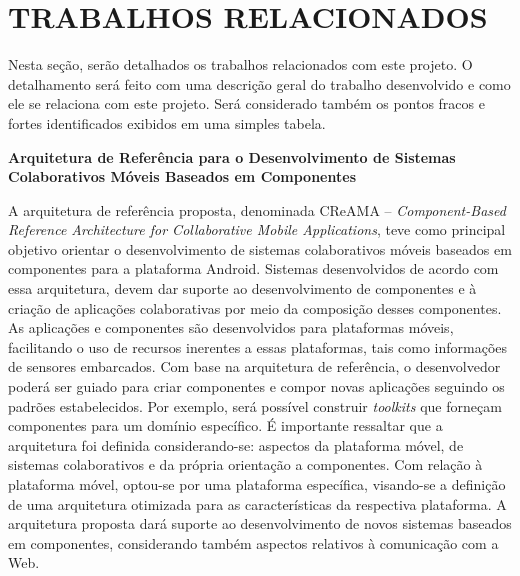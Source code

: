
\section{TRABALHOS RELACIONADOS}
Nesta seção, serão detalhados os trabalhos relacionados com este projeto. O detalhamento será feito com uma descrição geral do trabalho desenvolvido e como ele se relaciona com este projeto. Será considerado também os pontos fracos e fortes identificados exibidos em uma simples tabela.

\textbf{Arquitetura de Referência para o Desenvolvimento de Sistemas Colaborativos Móveis Baseados em Componentes}\par
A arquitetura de referência proposta, denominada CReAMA – \textit{Component-Based Reference Architecture for Collaborative Mobile Applications}, teve como principal objetivo orientar o desenvolvimento de sistemas colaborativos móveis baseados em componentes para a plataforma Android. Sistemas desenvolvidos de acordo com essa arquitetura, devem dar suporte ao desenvolvimento de componentes e à criação de aplicações colaborativas por meio da composição desses componentes. As aplicações e componentes são desenvolvidos para plataformas móveis, facilitando o uso de recursos inerentes a essas plataformas, tais como informações de sensores embarcados. Com base na arquitetura de referência, o desenvolvedor poderá ser guiado para criar componentes e compor novas aplicações seguindo os padrões estabelecidos. Por exemplo, será possível construir \textit{toolkits} que forneçam componentes para um domínio específico. É importante ressaltar que a arquitetura foi definida considerando-se: aspectos da plataforma móvel, de sistemas colaborativos e da própria orientação a componentes. Com relação à plataforma móvel, optou-se por uma plataforma específica, visando-se a definição de uma arquitetura otimizada para as características da respectiva plataforma. A arquitetura proposta dará suporte ao desenvolvimento de novos sistemas baseados em componentes, considerando também aspectos relativos à comunicação com a Web.


